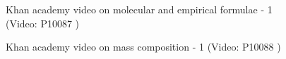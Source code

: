     \noindent
\label{m38712*eip-762}
    \setcounter{subfigure}{0}
	\begin{figure}[H] %
    \textnormal{Khan academy video on molecular and empirical formulae - 1} \nopagebreak
  \label{m38712*yt-media1}\label{m38712*yt-video1}
             { (Video:  P10087 )}
 \end{figure}       \par \label{m38712*eip-306}
    \setcounter{subfigure}{0}
	\begin{figure}[H] %
    \textnormal{Khan academy video on mass composition - 1}\nopagebreak
  \label{m38712*yt-media3}\label{m38712*yt-video3}
             { (Video:  P10088 )}
 \end{figure}       \par \label{m38712*secfhsst!!!underscore!!!id1437}
